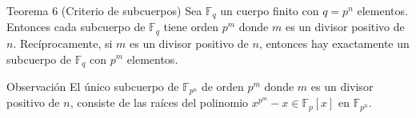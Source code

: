 \documentclass[presentation]{beamer}
\newcommand{\F}{\mathds{F}}
\begin{document}
\begin{frame}
  \begin{block}{Teorema 6 (Criterio de subcuerpos)}
    Sea $\F_q$ un cuerpo finito con $q=p^n$ elementos. Entonces cada subcuerpo de $\F_q$ tiene orden $p^m$ donde $m$ es un divisor positivo de $n$. Recíprocamente, si $m$ es un divisor positivo de $n$, entonces hay exactamente un subcuerpo de $\F_q$ con $p^m$ elementos.

    \begin{figure}[H]
      \centering
    \end{figure}
  \end{block}
  \pause
  \begin{block}{Observación}
    El único subcuerpo de $\F_{p^n}$ de orden $p^m$ donde $m$ es un divisor positivo de $n$, consiste de las raíces del polinomio $x^{p^m}-x \in \F_p[x]$ en $\F_{p^n}$.
  \end{block}
\end{frame}
\end{document}
